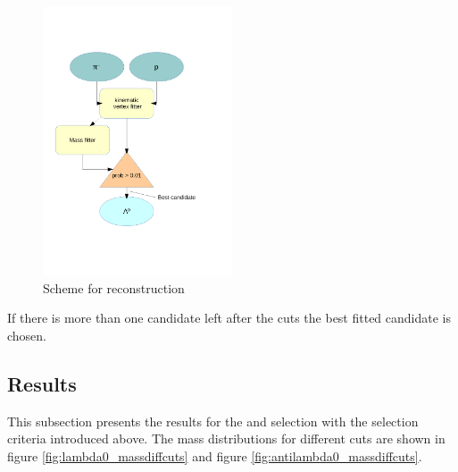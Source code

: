 		\begin{figure}
			\centering
				\includegraphics[width=0.50\textwidth]{./plots/combineLambda0.pdf}
			\caption{Scheme for \lam reconstruction}
			\label{fig:lambda_scheme}
		\end{figure}
		
		If there is more than one candidate left after the cuts the best fitted candidate is chosen.
		
		
	\subsection*{Results}
		This subsection presents the results for the \lam and \alam selection with the selection criteria introduced above.
		The mass distributions for different cuts are shown in figure \ref{fig:lambda0_massdiffcuts} and figure \ref{fig:antilambda0_massdiffcuts}.
	
